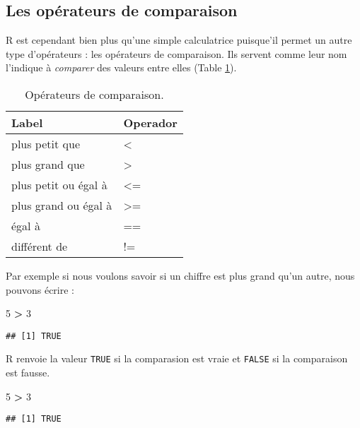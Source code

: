 \documentclass[]{book}
\newenvironment{Shaded}{\begin{snugshade}}{\end{snugshade}}
\newcommand{\DecValTok}[1]{\textcolor[rgb]{0.00,0.00,0.81}{#1}}
\newcommand{\StringTok}[1]{\textcolor[rgb]{0.31,0.60,0.02}{#1}}
\newcommand{\OperatorTok}[1]{\textcolor[rgb]{0.81,0.36,0.00}{\textbf{#1}}}
\theoremstyle{definition}
\theoremstyle{definition}
\theoremstyle{definition}
\theoremstyle{remark}
\begin{document}
\hypertarget{l011opcomp}{\subsection{Les opérateurs de
comparaison}\label{l011opcomp}}

R est cependant bien plus qu'une simple calculatrice puisque'il permet
un autre type d'opérateurs : les opérateurs de comparaison. Ils servent
comme leur nom l'indique à \emph{comparer} des valeurs entre elles
(Table \ref{tab:tabOpCom}).

\begin{table}

\caption{\label{tab:tabOpCom}Opérateurs de comparaison.\label{tab:tabOpCom}}
\centering
\begin{tabular}[t]{l|l}
\hline
Label & Operador\\
\hline
plus petit que & <\\
\hline
plus grand que & >\\
\hline
plus petit ou égal à & <=\\
\hline
plus grand ou égal à & >=\\
\hline
égal à & ==\\
\hline
différent de & !=\\
\hline
\end{tabular}
\end{table}

Par exemple si nous voulons savoir si un chiffre est plus grand qu'un
autre, nous pouvons écrire :

\begin{Shaded}
\begin{Highlighting}[]
\DecValTok{5} \OperatorTok{>}\StringTok{ }\DecValTok{3} 
\end{Highlighting}
\end{Shaded}

\begin{verbatim}
## [1] TRUE
\end{verbatim}

R renvoie la valeur \texttt{TRUE} si la comparasion est vraie et
\texttt{FALSE} si la comparaison est fausse.

\begin{Shaded}
\begin{Highlighting}[]
\DecValTok{5} \OperatorTok{>}\StringTok{ }\DecValTok{3}
\end{Highlighting}
\end{Shaded}

\begin{verbatim}
## [1] TRUE
\end{verbatim}
\end{document}
